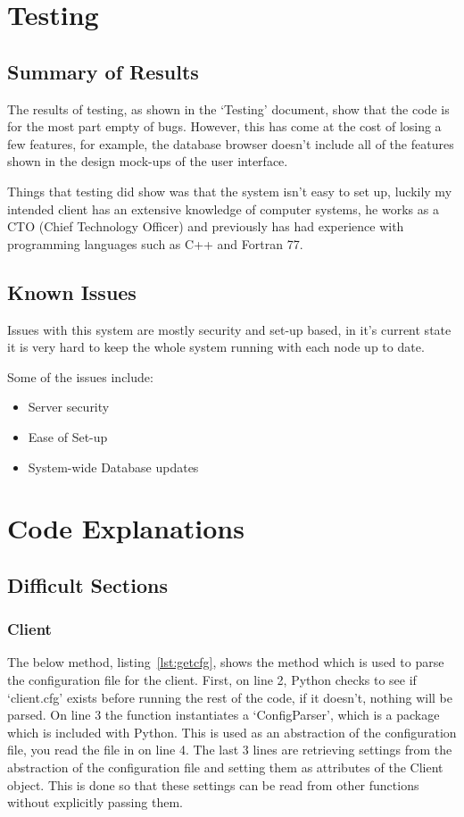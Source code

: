 \documentclass[12pt,a4paper]{report}
\begin{document}
\section{Testing}
    \subsection{Summary of Results}
        The results of testing, as shown in the `Testing' document, show that the code is for the most part empty of bugs. However, this
        has come at the cost of losing a few features, for example, the database browser doesn't include all of the features shown in the 
        design mock-ups of the user interface.

        Things that testing did show was that the system isn't easy to set up, luckily my intended client has an extensive knowledge of
        computer systems, he works as a CTO (Chief Technology Officer) and previously has had experience with programming languages such as
        C++ and Fortran 77.
    \subsection{Known Issues}
        Issues with this system are mostly security and set-up based, in it's current state it is very hard to keep the whole system running
        with each node up to date. 

        Some of the issues include:
        \begin{itemize}
            \item Server security
            \item Ease of Set-up
            \item System-wide Database updates
        \end{itemize}

\section{Code Explanations}
    \subsection{Difficult Sections}
        \subsubsection{Client}

        The below method, listing~\ref{lst:getcfg}, shows the method which is used to parse the configuration file for the client. First, on line 2,
        Python checks to see if `client.cfg' exists before running the rest of the code, if it doesn't, nothing will be parsed. On line 3 the function
        instantiates a `ConfigParser', which is a package which is included with Python. This is used as an abstraction of the configuration file, you
        read the file in on line 4. The last 3 lines are retrieving settings from the abstraction of the configuration file and setting them as attributes
        of the Client object. This is done so that these settings can be read from other functions without explicitly passing them.
\end{document}
